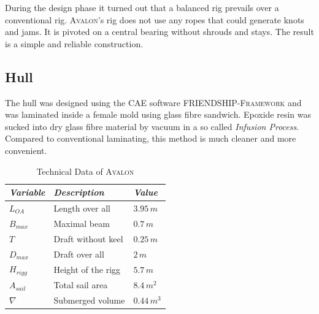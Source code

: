 During the design phase it turned out that a balanced rig prevails over a
conventional rig.
\textsc{Avalon}'s rig does not use any ropes
that could generate knots and jams. It is pivoted on a central
bearing without shrouds and stays. The result is a simple and reliable construction.
%
\subsection{Hull}

The hull was designed using the CAE software \textsc{FRIENDSHIP-Framework} and
was laminated inside a female mold using glass fibre
sandwich. Epoxide resin was sucked into dry glass fibre material by
vacuum in a so called \textit{Infusion Process}. Compared to
conventional laminating, this method is much cleaner and more
convenient.

\begin{table}[htb]

    \begin{center}
     \caption{Technical Data of \textsc{Avalon}}
	\label{tab:avalon_data}
        \begin{tabular}[htb]{l|l|l}
            \hline
            \emph{Variable}    &   \emph{Description} &   \emph{Value}\\ \hline\hline
            $L_{OA}$    &   Length over all	& $3.95\,m$\\
            $B_{max}$   &   Maximal beam	& $0.7\,m$\\
            $T$         &   Draft without keel  & $0.25\,m$\\
            $D_{max}$	&   Draft over all	& $2\,m$\\
            $H_{rigg}$	&   Height of the rigg  & $5.7\,m$\\
            $A_{sail}$	&   Total sail area     & $8.4\,m^2$\\
            $\nabla$    &   Submerged volume    & $0.44\,m^3$\\
            \hline
        \end{tabular}
    \end{center}
\end{table}


